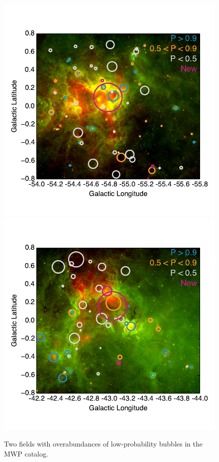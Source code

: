 \begin{figure}
\includegraphics[trim=0 .3in 0 .6in, clip]{l305}
\includegraphics[trim=0 .3in 0 .6in, clip]{l317}
\caption{Two fields with overabundances of low-probability bubbles in the MWP catalog.}
\label{fig:wide_fields}
\end{figure}


